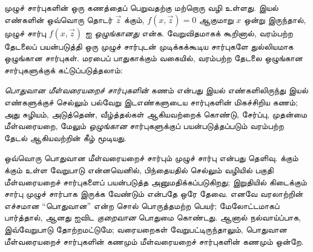 \documentclass[../../../include/open-logic-section]{subfiles}
\begin{document}


முழுச் சார்புகளின் ஒரு கணத்தைப் பெறுவதற்கு மற்றொரு வழி உள்ளது.
இயல் எண்களின் ஒவ்வொரு தொடர் $\vec z$ க்கும்,
$f(x,\vec z) = 0$ ஆகுமாறு $x$ ஒன்று இருந்தால், முழுச் சார்பு
$f(x,\vec z)$ ஐ \emph{ஒழுங்கானது} என்க. வேறுவிதமாகக் கூறினால்,
வரம்பற்ற தேடலைப் பயன்படுத்தி ஒரு முழுச் சார்புடன் முடிக்கக்கூடிய
சார்புகளே துல்லியமாக ஒழுங்கான சார்புகள். மரபைப் பாதுகாக்கும்
வகையில், வரம்பற்ற தேடலை ஒழுங்கான சார்புகளுக்குக் கட்டுப்படுத்தலாம்:

\begin{defn}
\emph{பொதுவான மீள்வரையறைச் சார்புகளின்} கணம் என்பது இயல்
எண்களிலிருந்து இயல் எண்களுக்குச் செல்லும் பல்வேறு இடஎண்களுடைய
சார்புகளின் மிகச்சிறிய கணம்; அது சுழியம், அடுத்தெண், வீழ்த்தல்கள்
ஆகியவற்றைக் கொண்டு, சேர்ப்பு, முதன்மை மீள்வரையறை, மேலும்
\emph{ஒழுங்கான} சார்புகளுக்குப் பயன்படுத்தப்படும் வரம்பற்ற தேடல்
ஆகியவற்றின் கீழ் மூடியது.
\end{defn}

ஒவ்வொரு பொதுவான மீள்வரையறைச் சார்பும் முழுச் சார்பு என்பது தெளிவு.
 க்கும்
 க்கும் உள்ள வேறுபாடு என்னவெனில்,
பிந்தையதில் செல்லும் வழியில் பகுதி மீள்வரையறைச் சார்புகளைப் பயன்படுத்த
அனுமதிக்கப்படுகிறது; இறுதியில் கிடைக்கும் சார்பு முழுச் சார்பாக
இருக்க வேண்டும் என்பதே ஒரே தேவை. எனவே வரலாற்றின் எச்சமான
“பொதுவான” என்ற சொல் பொருத்தமற்ற பெயர்; மேலோட்டமாகப் பார்த்தால்,
 ஆனது
 ஐவிட \emph{குறைவான} பொதுமை கொண்டது.
ஆனால் நல்வாய்ப்பாக, இவ்வேறுபாடு தோற்றமட்டுமே; வரையறைகள்
வேறுபட்டிருந்தாலும், பொதுவான மீள்வரையறைச் சார்புகளின் கணமும்
மீள்வரையறைச் சார்புகளின் கணமும் ஒன்றே.
\end{document}
